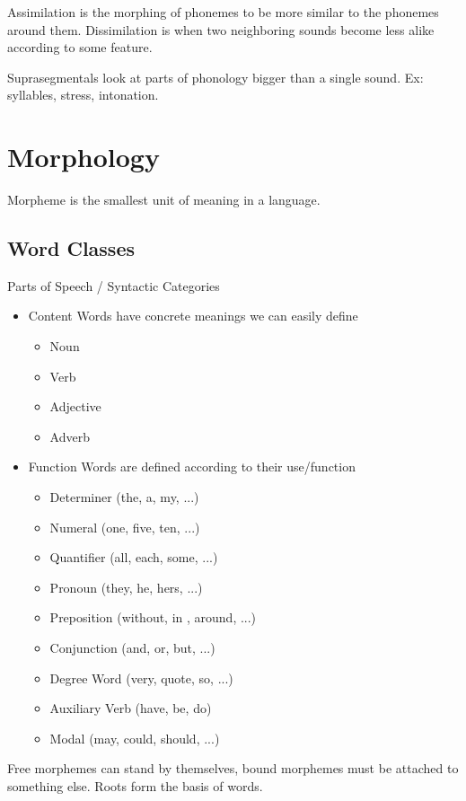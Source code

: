 \documentclass[12pt]{article}
\begin{document}
Assimilation is the morphing of phonemes to be more similar to the phonemes around them. Dissimilation is when two neighboring sounds become less alike according to some feature.

Suprasegmentals look at parts of phonology bigger than a single sound. Ex: syllables, stress, intonation.

\section{Morphology}

Morpheme is the smallest unit of meaning in a language.

\subsection{Word Classes}

Parts of Speech / Syntactic Categories

\begin{itemize}

\item Content Words have concrete meanings we can easily define
\begin{itemize}
\item Noun
\item Verb
\item Adjective
\item Adverb
\end{itemize}
\item Function Words are defined according to their use/function
\begin{itemize}
\item Determiner (the, a, my, ...)
\item Numeral (one, five, ten, ...)
\item Quantifier (all, each, some, ...)
\item Pronoun (they, he, hers, ...)
\item Preposition (without, in , around, ...)
\item Conjunction (and, or, but, ...)
\item Degree Word (very, quote, so, ...)
\item Auxiliary Verb (have, be, do)
\item Modal (may, could, should, ...)
\end{itemize}
\end{itemize}

Free morphemes can stand by themselves, bound morphemes must be attached to something else. Roots form the basis of words.
\end{document}
